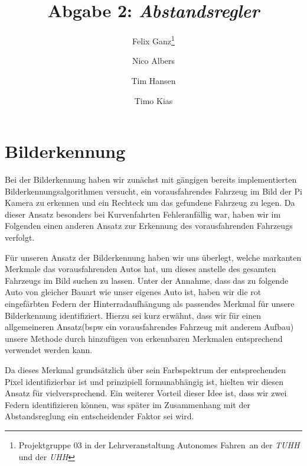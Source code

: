 \documentclass[10pt]{article}
\author{Felix Ganz\thanks{Projektgruppe 03 in der Lehrveranstaltung \glqq Autonomes Fahren\grqq\ an der \emph{TUHH} und der \emph{UHH}}\and Nico Albers\footnotemark[1] \and Tim Hansen\footnotemark[1]\and Timo Kias\footnotemark[1]}
\title{Abgabe 2: \emph{Abstandsregler}}
\begin{document}
\maketitle
\tableofcontents

\section{Bilderkennung}
Bei der Bilderkennung haben wir zunächst mit gängigen bereits implementierten Bilderkennungsalgorithmen versucht, ein vorausfahrendes Fahrzeug im Bild der Pi Kamera zu erkennen und ein Rechteck um das gefundene Fahrzeug zu legen.
Da dieser Ansatz besonders bei Kurvenfahrten Fehleranfällig war, haben wir im Folgenden einen anderen Ansatz zur Erkennung des vorausfahrenden Fahrzeugs verfolgt.

Für unseren Ansatz der Bilderkennung haben wir uns überlegt, welche markanten Merkmale das vorausfahrenden Autos hat, um dieses anstelle des gesamten Fahrzeugs im Bild suchen zu lassen.
Unter der Annahme, dass das zu folgende Auto von gleicher Bauart wie unser eigenes Auto ist, haben wir die rot eingefärbten Federn der Hinterradaufhängung als passendes Merkmal für unsere Bilderkennung identifiziert.
Hierzu sei kurz erwähnt, dass wir für einen allgemeineren Ansatz(bspw ein vorausfahrendes Fahrzeug mit anderem Aufbau) unsere Methode durch hinzufügen von erkennbaren Merkmalen entsprechend verwendet werden kann.

Da dieses Merkmal grundsätzlich über sein Farbspektrum der entsprechenden Pixel identifizierbar ist und prinzipiell formunabhängig ist, hielten wir diesen Ansatz für vielversprechend. Ein weiterer Vorteil dieser Idee ist, dass wir zwei Federn identifizieren können, was später im Zusammenhang mit der Abstandsreglung ein entscheidender Faktor sei wird.
\end{document}
